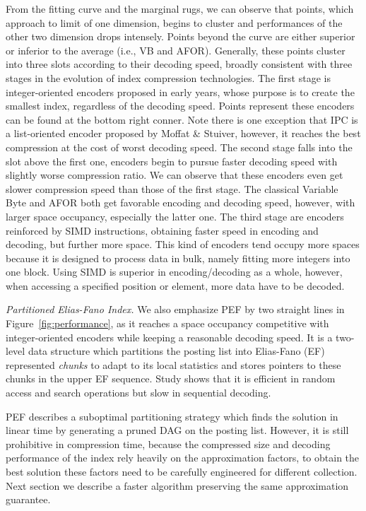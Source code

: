 \documentclass[runningheads,a4paper]{llncs}
\begin{document}
From the fitting curve and the marginal rugs, we can observe that points, which approach to limit of one dimension, begins to cluster and performances of the other two dimension drops intensely.
Points beyond the curve are either superior or inferior to the average (i.e., VB and AFOR).
Generally, these points cluster into three slots according to their decoding speed, broadly consistent with three stages in the evolution of index compression technologies.
The first stage is integer-oriented encoders proposed in early years, whose purpose is to create the smallest index, regardless of the decoding speed.
Points represent these encoders can be found at the bottom right conner.
Note there is one exception that IPC is a list-oriented encoder proposed by Moffat \& Stuiver\cite{moffat2000binary}, however, it reaches the best compression at the cost of worst decoding speed.
The second stage falls into the slot above the first one, encoders begin to pursue faster decoding speed with slightly worse compression ratio.
We can observe that these encoders even get slower compression speed than those of the first stage.
The classical Variable Byte and AFOR both get favorable encoding and decoding speed, however, with larger space occupancy, especially the latter one.
The third stage are encoders reinforced by SIMD instructions, obtaining faster speed in encoding and decoding, but further more space.
This kind of encoders tend occupy more spaces because it is designed to process data in bulk, namely fitting more integers into one block.
Using SIMD is superior in encoding/decoding as a whole, however, when accessing a specified position or element, more data have to be decoded.

\textit{Partitioned Elias-Fano Index.}
We also emphasize PEF by two straight lines in Figure~\ref{fig:performance}, as it reaches a space occupancy competitive with integer-oriented encoders while keeping a reasonable decoding speed. It is a two-level data structure which partitions the posting list into Elias-Fano (EF) represented \textit{chunks} to adapt to its local statistics and stores pointers to these chunks in the upper EF sequence. Study shows that it is efficient in random access and search operations but slow in sequential decoding\cite{ottaviano2015optimal,vigna2013quasi}.

PEF describes a suboptimal partitioning strategy which finds the solution in linear time by generating a pruned DAG on the posting list.
However, it is still prohibitive in compression time, because the compressed size and decoding performance of the index rely heavily on the approximation factors, to obtain the best solution these factors need to be carefully engineered for different collection.
Next section we describe a faster algorithm preserving the same approximation guarantee.
\end{document}
